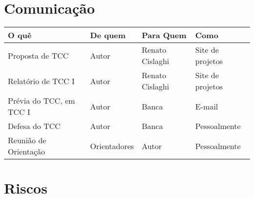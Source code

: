 \section{Comunicação}
    \begin{tabular}{l l l l}
        \hline
        O quê  & De quem & Para Quem & Como \\
        \hline
        Proposta de TCC         & Autor     & Renato Cislaghi   & Site de projetos \\
        Relatório de TCC I      & Autor     & Renato Cislaghi   & Site de projetos \\
        Prévia do TCC, em TCC I & Autor     & Banca             & E-mail \\
        Defesa do TCC           & Autor     & Banca             & Pessoalmente \\
        Reunião de Orientação   & Orientadores  & Autor         & Pessoalmente \\
        \hline
    \end{tabular}
    \hfill\cite{Silva}


\section{Riscos}

